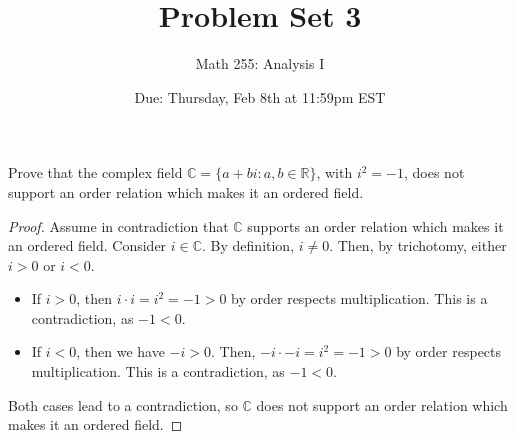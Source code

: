 \documentclass[10pt]{article}
\newcommand{\R}{\mathbb{R}}
\newcommand{\C}{\mathbb{C}}
\newenvironment{problem}[2][Problem]{\begin{trivlist}
\item[\hskip \labelsep {\bfseries #1}\hskip \labelsep {\bfseries #2.}]}{\end{trivlist}}
\begin{document}
\title{Problem Set 3}
\author{Math 255: Analysis I}
\date{Due: Thursday, Feb 8th at 11:59pm EST}

\maketitle

\begin{problem}{1}
	Prove that the complex field $ \C=\{a+bi : a,b \in \R \} $, with $ i^2=-1 $, does not support an order relation which makes it an ordered field.
    \begin{proof}
        Assume in contradiction that $ \C $ supports an order relation which makes it an ordered field. Consider $i \in \C$. By definition, $i \neq 0$. Then, by trichotomy, either $i > 0$ or $i < 0$.
        \begin{itemize}
            \item If $i > 0$, then $i \cdot i = i^2 = -1 > 0$ by order respects multiplication. This is a contradiction, as $-1 < 0$.
            \item If $i < 0$, then we have $-i > 0$. Then, $-i \cdot -i = i^2 = -1 > 0$ by order respects multiplication. This is a contradiction, as $-1 < 0$.
        \end{itemize}
        Both cases lead to a contradiction, so $ \C $ does not support an order relation which makes it an ordered field.
    \end{proof}
\end{problem}
\medskip

\newpage
\end{document}
